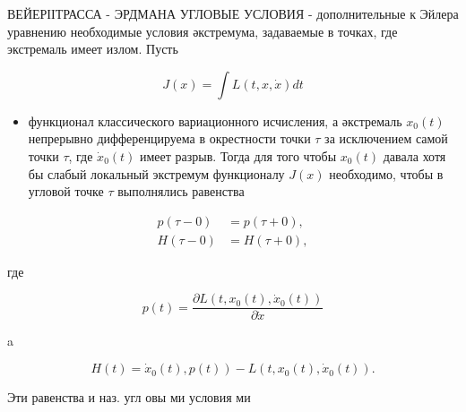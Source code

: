 \documentclass[10pt]{article}
\begin{document}
ВЕЙЕРІІТРАССА - ЭРДМАНА УГЛОВЫЕ УСЛОВИЯ - дополнительные к Эйлера уравнению необходимые условия әкстремума, задаваемые в точках, где экстремаль имеет излом. Пусть



\[

J(x)=\int L(t, x, \dot{x}) d t

\]



\begin{itemize}

  \item функционал классического вариационного исчисления, а әкстремаль $x_{0}(t)$ непрерывно дифференцируема в окрестности точки $\tau$ за исключением самой точки $\tau$, где $\dot{x}_{0}(t)$ имеет разрыв. Тогда для того чтобы $x_{0}(t)$ давала хотя бы слабый локальный экстремум функционалу $J(x)$ необходимо, чтобы в угловой точке $\tau$ выполнялись равенства

\end{itemize}



\[

\begin{aligned}

p(\tau-0) & =p(\tau+0), \\

H(\tau-0) & =H(\tau+0),

\end{aligned}

\]



где



\[

p(t)=\frac{\partial L\left(t, x_{0}(t), \dot{x}_{0}(t)\right)}{\partial \dot{x}}

\]



a



\[

\left.H(t)=\dot{x}_{0}(t), p(t)\right)-L\left(t, x_{0}(t), \dot{x}_{0}(t)\right) .

\]



Эти равенства и наз. угл овы ми условия ми
\end{document}
